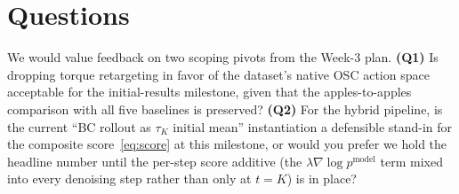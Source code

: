 \documentclass[letterpaper, 10 pt, conference]{ieeeconf}
\begin{document}
\section{Questions}

We would value feedback on two scoping pivots from the Week-3 plan.
\textbf{(Q1)} Is dropping torque retargeting in favor of the
dataset's native OSC action space acceptable for the
initial-results milestone, given that the apples-to-apples
comparison with all five baselines is preserved? \textbf{(Q2)}
For the hybrid pipeline, is the current ``BC rollout as
$\tau_K$ initial mean'' instantiation a defensible stand-in for
the composite score~\eqref{eq:score} at this milestone, or would
you prefer we hold the headline number until the per-step score
additive (the $\lambda\nabla\log p^{\mathrm{model}}$ term mixed
into every denoising step rather than only at $t\!=\!K$) is in
place?



\end{document}
